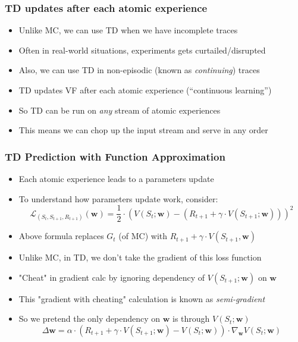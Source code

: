 \documentclass[handout]{beamer}
\begin{document}
\begin{frame}
\frametitle{TD updates after each atomic experience}
\pause
\begin{itemize}[<+->]
\item Unlike MC, we can use TD when we have incomplete traces
\item Often in real-world situations,  experiments gets curtailed/disrupted
\item  Also, we can use TD in non-episodic (known as {\em continuing}) traces
\item  TD updates VF after each atomic experience (``continuous learning'') 
\item So TD can be run on {\em any} stream of atomic experiences
\item This means we can chop up the input stream and serve in any order
\end{itemize}
\end{frame}

\begin{frame}
\frametitle{TD Prediction with Function Approximation}
\pause
\begin{itemize}[<+->]
\item Each atomic experience leads to a parameters update
\item To understand how parameters update work, consider:
$$\mathcal{L}_{(S_t,S_{t+1},R_{t+1})}(\bm{w}) = \frac 1 2 \cdot (V(S_t;\bm{w}) - (R_{t+1} + \gamma \cdot V(S_{t+1}; \bm{w})))^2$$
\item Above formula replaces $G_t$ (of MC) with $R_{t+1} + \gamma \cdot V(S_{t+1}, \bm{w})$
\item Unlike MC, in TD, we don't take the gradient of this loss function
\item "Cheat" in gradient calc by ignoring dependency of $V(S_{t+1}; \bm{w})$ on $\bm{w}$
\item This "gradient with cheating" calculation is known as {\em semi-gradient}
\item So we pretend the only dependency on $\bm{w}$ is through $V(S_t; \bm{w})$
$$\Delta \bm{w} = \alpha \cdot (R_{t+1} + \gamma \cdot V(S_{t+1};\bm{w}) - V(S_t;\bm{w})) \cdot \nabla_{\bm{w}} V(S_t;\bm{w})$$
\end{itemize}
\end{frame}
\end{document}
